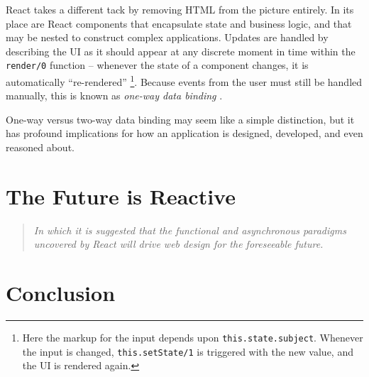 \documentclass[12pt,letterpaper]{article}
\begin{document}
React takes a different tack by removing HTML from the picture entirely. In its place are React components that encapsulate state and business logic, and that may be nested to construct complex applications. Updates are handled by describing the UI as it should appear at any discrete moment in time within the \texttt{render/0} function -- whenever the state of a component changes, it is automatically ``re-rendered'' \footnote{Here the markup for the input depends upon \texttt{this.state.subject}. Whenever the input is changed, \texttt{this.setState/1} is triggered with the new value, and the UI is rendered again.}. Because events from the user must still be handled manually, this is known as \emph{one-way data binding} \cite{Hunt:2014}.




One-way versus two-way data binding may seem like a simple distinction, but it has profound implications for how an application is designed, developed, and even reasoned about.












\section{The Future is Reactive}
\vspace{-12pt}

\begin{quote}
	\singlespacing
	\emph{In which it is suggested that the functional and asynchronous paradigms uncovered by React will drive web design for the foreseeable future.}
\end{quote}




\section{Conclusion}
\vspace{-12pt}
\end{document}
